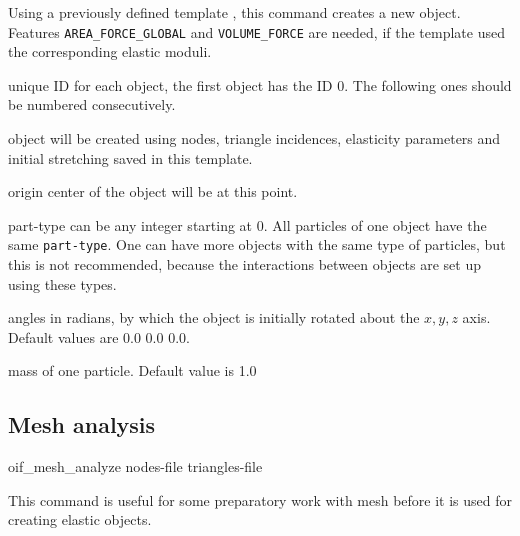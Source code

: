 Using a previously defined template , this command creates a new object. Features \verb|AREA_FORCE_GLOBAL| and \verb|VOLUME_FORCE| are needed, if the template used the corresponding elastic moduli.

\begin{arguments}
\item[\var{oid}] unique ID for each object, the first object has the ID 0. The following ones should be numbered consecutively.
\item[\var{tid}] object will be created using nodes, triangle incidences, elasticity parameters and initial stretching saved in this template.
\item[origin \var{x} \var{y} \var{z}] center of the object will be at this point.
\item[part-type \var{type}] can be any integer starting at 0. All particles of one object have the same \verb|part-type|. One can have more objects with the same type of particles, but this is not recommended, because the interactions between objects are set up using these types.
\item[\opt{rotate \var{x} \var{y} \var{z}}] angles in radians, by which the object is initially rotated about the $x, y, z$ axis. Default values are 0.0 0.0 0.0.
\item[\opt{mass \var{m}}] mass of one particle. Default value is 1.0
\end{arguments}

\subsection{\label{ssec:oif-mesh-analyze}Mesh analysis}

\begin{essyntax}
  oif_mesh_analyze
  nodes-file  
  triangles-file  
\end{essyntax}

This command is useful for some preparatory work with mesh before it is used for creating elastic objects.


